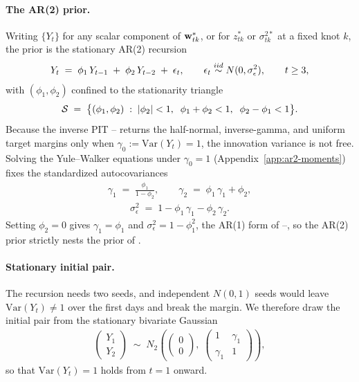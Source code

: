 \documentclass[12pt]{article}
\begin{document}
\paragraph{The AR(2) prior.}
Writing $\{Y_t\}$ for any scalar component of $\mbox{\bf w}^*_{tk}$, or for $z^*_{tk}$ or $\sigma^{2*}_{tk}$ at a fixed knot $k$, the prior is the stationary AR(2) recursion
\begin{align}
  Y_t \;=\; \phi_1\, Y_{t-1} \;+\; \phi_2\, Y_{t-2} \;+\; \epsilon_t,
  \qquad \epsilon_t \stackrel{iid}{\sim} N(0, \sigma_\epsilon^2),
  \qquad t \ge 3, \label{eq:ar2-recursion}
\end{align}
with $(\phi_1, \phi_2)$ confined to the stationarity triangle
\begin{align}
  {\cal S} \;=\; \big\{ (\phi_1, \phi_2) \;:\; |\phi_2| < 1, \;\; \phi_1 + \phi_2 < 1, \;\; \phi_2 - \phi_1 < 1 \big\}. \label{eq:stab-triangle}
\end{align}
Because the inverse PIT -- returns the half-normal, inverse-gamma, and uniform target margins only when $\gamma_0 := \mathrm{Var}(Y_t) = 1$, the innovation variance is not free.  Solving the Yule--Walker equations under $\gamma_0 = 1$ (Appendix~\ref{app:ar2-moments}) fixes the standardized autocovariances
\begin{align}
  \gamma_1 \;=\; \frac{\phi_1}{1 - \phi_2}, \qquad
  \gamma_2 \;=\; \phi_1\, \gamma_1 + \phi_2, \label{eq:gamma12}
\end{align}
\begin{align}
  \sigma_\epsilon^2 \;=\; 1 - \phi_1\, \gamma_1 - \phi_2\, \gamma_2. \label{eq:sigeps}
\end{align}
Setting $\phi_2 = 0$ gives $\gamma_1 = \phi_1$ and $\sigma_\epsilon^2 = 1 - \phi_1^2$, the AR(1) form of --, so the AR(2) prior strictly nests the prior of \textcite{morris_space-time_2017}.

\paragraph{Stationary initial pair.}
The recursion  needs two seeds, and independent $N(0, 1)$ seeds would leave $\mathrm{Var}(Y_t) \ne 1$ over the first days and break the margin.  We therefore draw the initial pair from the stationary bivariate Gaussian
\begin{align}
  \begin{pmatrix} Y_1 \\ Y_2 \end{pmatrix}
  \;\sim\;
  N_2\!\left(
    \begin{pmatrix} 0 \\ 0 \end{pmatrix},\;
    \begin{pmatrix} 1 & \gamma_1 \\ \gamma_1 & 1 \end{pmatrix}
  \right), \label{eq:joint-init}
\end{align}
so that $\mathrm{Var}(Y_t) = 1$ holds from $t = 1$ onward.
\end{document}
